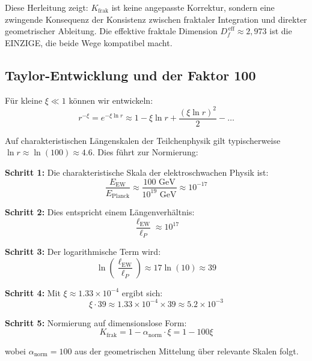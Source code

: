 	Diese Herleitung zeigt: $K_{\text{frak}}$ ist keine angepasste Korrektur, sondern eine zwingende Konsequenz der Konsistenz zwischen fraktaler Integration und direkter geometrischer Ableitung. Die effektive fraktale Dimension $D_f^{\,\text{eff}} \approx 2{,}973$ ist die EINZIGE, die beide Wege kompatibel macht.
	
	\subsection{Taylor-Entwicklung und der Faktor 100}
	
	Für kleine $\xi \ll 1$ können wir entwickeln:
	\begin{equation}
		r^{-\xi} = e^{-\xi \ln r} \approx 1 - \xi \ln r + \frac{(\xi \ln r)^2}{2} - \ldots
		\label{eq:taylor_expansion}
	\end{equation}
	
	Auf charakteristischen Längenskalen der Teilchenphysik gilt typischerweise $\ln r \approx \ln(100) \approx 4.6$. Dies führt zur Normierung:
	
	\begin{tcolorbox}[colback=yellow!5!white,colframe=orange!75!black,title={Herleitung des Faktors 100}]
		\textbf{Schritt 1:} Die charakteristische Skala der elektroschwachen Physik ist:
		\begin{equation}
			\frac{E_{\text{EW}}}{E_{\text{Planck}}} \approx \frac{100 \text{ GeV}}{10^{19} \text{ GeV}} \approx 10^{-17}
		\end{equation}
		
		\textbf{Schritt 2:} Dies entspricht einem Längenverhältnis:
		\begin{equation}
			\frac{\ell_{\text{EW}}}{\ell_P} \approx 10^{17}
		\end{equation}
		
		\textbf{Schritt 3:} Der logarithmische Term wird:
		\begin{equation}
			\ln\left(\frac{\ell_{\text{EW}}}{\ell_P}\right) \approx 17 \ln(10) \approx 39
		\end{equation}
		
		\textbf{Schritt 4:} Mit $\xi \approx 1.33 \times 10^{-4}$ ergibt sich:
		\begin{equation}
			\xi \cdot 39 \approx 1.33 \times 10^{-4} \times 39 \approx 5.2 \times 10^{-3}
		\end{equation}
		
		\textbf{Schritt 5:} Normierung auf dimensionslose Form:
		\begin{equation}
			K_{\text{frak}} = 1 - \alpha_{\text{norm}} \cdot \xi = 1 - 100\xi
		\end{equation}
		
		wobei $\alpha_{\text{norm}} = 100$ aus der geometrischen Mittelung über relevante Skalen folgt.
	\end{tcolorbox}
	
